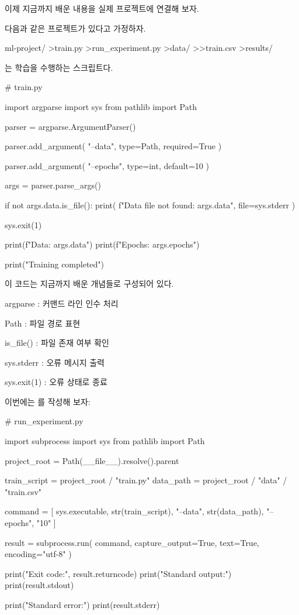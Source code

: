 이제 지금까지 배운 내용을 실제 프로젝트에 연결해 보자.

다음과 같은 프로젝트가 있다고 가정하자.

\begin{dhkdir}
ml-project/
>train.py
>run_experiment.py
>data/
>>train.csv
>results/
\end{dhkdir}

는 학습을 수행하는 스크립트다.

\begin{dhkcode}
# train.py

import argparse
import sys
from pathlib import Path

parser = argparse.ArgumentParser()

parser.add_argument(
    "--data",
    type=Path,
    required=True
)

parser.add_argument(
    "--epochs",
    type=int,
    default=10
)

args = parser.parse_args()

if not args.data.is_file():
    print(
        f"Data file not found: {args.data}",
        file=sys.stderr
    )

    sys.exit(1)

print(f"Data: {args.data}")
print(f"Epochs: {args.epochs}")

print("Training completed")
\end{dhkcode}

이 코드는 지금까지 배운 개념들로 구성되어 있다.

\begin{dhksmry}
    argparse    : 커맨드 라인 인수 처리

    Path        : 파일 경로 표현

    is_file()   : 파일 존재 여부 확인

    sys.stderr  : 오류 메시지 출력

    sys.exit(1) : 오류 상태로 종료
\end{dhksmry}

이번에는 를 작성해 보자:

\begin{dhkcode}
# run_experiment.py

import subprocess
import sys
from pathlib import Path

project_root = Path(__file__).resolve().parent

train_script = project_root / "train.py"
data_path = project_root / "data" / "train.csv"

command = [
    sys.executable,
    str(train_script),
    "--data",
    str(data_path),
    "--epochs",
    "10"
]

result = subprocess.run(
    command,
    capture_output=True,
    text=True,
    encoding="utf-8"
)

print("Exit code:", result.returncode)
print("Standard output:")
print(result.stdout)

print("Standard error:")
print(result.stderr)
\end{dhkcode}

